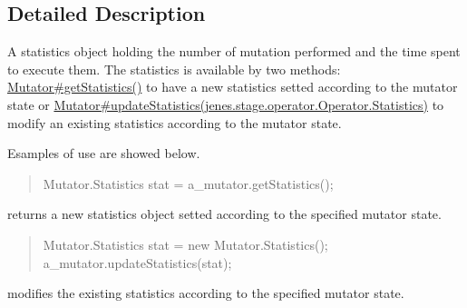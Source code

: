\subsection{Detailed Description}
A statistics object holding the number of mutation performed and the time spent to execute them. The statistics is available by two methods\-: \hyperlink{}{Mutator\#get\-Statistics()} to have a new statistics setted according to the mutator state or \hyperlink{}{Mutator\#update\-Statistics(jenes.\-stage.\-operator.\-Operator.\-Statistics)} to modify an existing statistics according to the mutator state. 

Esamples of use are showed below. 

\begin{quotation}

\begin{DoxyPre}
Mutator.Statistics stat = a\_mutator.getStatistics();
\end{DoxyPre}
\end{quotation}


returns a new statistics object setted according to the specified mutator state. 

\begin{quotation}

\begin{DoxyPre}
Mutator.Statistics stat = new Mutator.Statistics();
a\_mutator.updateStatistics(stat);
\end{DoxyPre}
\end{quotation}


modifies the existing statistics according to the specified mutator state. 


